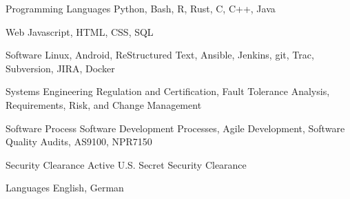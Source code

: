 


\begin{cvskills}


\cvskill
{Programming Languages} %
{Python, Bash, R, Rust, C, C++, Java} %


\cvskill
{Web} %
{Javascript, HTML, CSS, SQL} %


\cvskill
{Software} %
{Linux, Android, ReStructured Text, Ansible, Jenkins, git, Trac, Subversion, JIRA, Docker} %


\cvskill
{Systems Engineering}
{Regulation and Certification, Fault Tolerance Analysis, Requirements, Risk, and Change Management}

\cvskill
{Software Process}
{Software Development Processes, Agile Development, Software Quality Audits, AS9100, NPR7150}


\cvskill
{Security Clearance}
{Active U.S. Secret Security Clearance}


\cvskill
{Languages} %
{English, German} %


\end{cvskills}